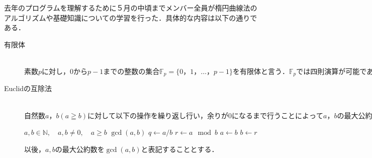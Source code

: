 \documentclass[openany,11pt,papersize]{jsbook}
\begin{document}
去年のプログラムを理解するために５月の中頃までメンバー全員が楕円曲線法のアルゴリズムや基礎知識についての学習を行った．具体的な内容は以下の通りである．
\begin{description}
 \item[有限体]\mbox{}\\ 
$素数pに対し，0からp-1までの整数の集合\mathbb{F}_p=\{0，1，…，p-1\}を有限体と言う．\mathbb{F}_pでは四則演算が可能であり，ECMではこの範囲で考える．$
 \item[Euclidの互除法]\mbox{}\\
$自然数a，b(a≧b)に対して以下の操作を繰り返し行い，余りが0になるまで行うことによってa，bの最大公約数を求めるものである．$

%
%
%
%
\begin{algorithm}[h]                   
\caption{Euclidean Algorithm}
\label{alg E}                          
\begin{algorithmic}                  
\REQUIRE $a,b \in \mathbb{N} , \quad a,b \neq 0,\quad a\ge b$
\ENSURE $\gcd (a,b)$
\STATE $q \leftarrow a/b$
\STATE $r \leftarrow a\mod b$
\STATE $a \leftarrow b$
\STATE $b \leftarrow r$
\ENDWHILE
\end{algorithmic}
\end{algorithm}
$以後，a,bの最大公約数を\gcd (a,b)と表記することとする．$
	

\end{description}
\end{document}
